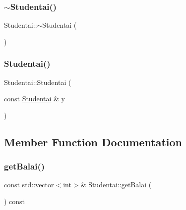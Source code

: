 \mbox{\label{class_studentai_a10895815f551906aae4c2823bfd1bbc5}} 
\subsubsection{\texorpdfstring{$\sim$Studentai()}{~Studentai()}}
{\footnotesize\ttfamily Studentai\+::$\sim$\+Studentai (\begin{DoxyParamCaption}{ }\end{DoxyParamCaption})\hspace{0.3cm}{\ttfamily [inline]}}

\mbox{\label{class_studentai_abc23c366de25bc9cf76208ca2093aa30}} 
\subsubsection{\texorpdfstring{Studentai()}{Studentai()}\hspace{0.1cm}{\footnotesize\ttfamily [2/2]}}
{\footnotesize\ttfamily Studentai\+::\+Studentai (\begin{DoxyParamCaption}\item[{const \mbox{\hyperlink{class_studentai}{Studentai}} \&}]{y }\end{DoxyParamCaption})\hspace{0.3cm}{\ttfamily [inline]}}



\subsection{Member Function Documentation}
\mbox{\label{class_studentai_a02288c042b8bda68ef6c39fbcce4bb18}} 
\subsubsection{\texorpdfstring{getBalai()}{getBalai()}}
{\footnotesize\ttfamily const std\+::vector$<$int$>$\& Studentai\+::get\+Balai (\begin{DoxyParamCaption}{ }\end{DoxyParamCaption}) const\hspace{0.3cm}{\ttfamily [inline]}}

